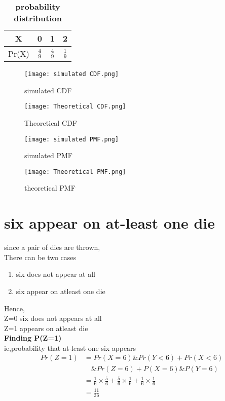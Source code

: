\documentclass[11pt,a4paper,twocolumn]{article}
\begin{document}
\begin{table}[ht]
    \centering
    \begin{tabular}{|c|c|c|c|}
    \hline
    X&0&1&2\\
    \hline
    Pr(X)&$\frac{4}{9}$&$\frac{4}{9}$&$\frac{1}{9}$\\
    \hline
    \end{tabular}
    \caption{\textbf{probability distribution}}
\end{table}
\begin{figure}[h!]
    \centering
    \texttt{[image: simulated CDF.png]}
    \caption{simulated CDF}
\end{figure}
\begin{figure}[h!]
    \centering
    \texttt{[image: Theoretical CDF.png]} 
    \caption{Theoretical CDF}
\end{figure}
\begin{figure}[h!]
    \centering
    \texttt{[image: simulated PMF.png]} 
    \caption{simulated PMF}
\end{figure}
\begin{figure}[h!]
    \centering
    \texttt{[image: Theoretical PMF.png]}
    \caption{theoretical PMF}
\end{figure}
\section{six appear on at-least one die}
since a pair of dies are thrown,\\
There can be two cases
\begin{enumerate}
    \item six does not appear at all
    \item six appear on atleast one die
\end{enumerate}
Hence,\\ Z=0 six does not appears at all\\
Z=1 appears on atleast die
\\ \textbf{Finding P(Z=1)}\\
ie,probability that at-least one six appears
\begin{align*}
Pr(Z=1)&=Pr(X=6)\&Pr(Y<6)+Pr(X<6)\\
&\quad\&Pr(Z=6) +P(X=6)\&P(Y=6)\\
&=\frac{1}{6}\times\frac{5}{6}+\frac{5}{6}\times\frac{1}{6}+\frac{1}{6}\times\frac{1}{6}\\
&=\frac{11}{36}
\end{align*}
\end{document}

